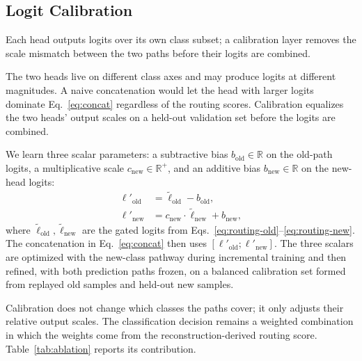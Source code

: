 \subsection{Logit Calibration}\label{sec:calib}

Each head outputs logits over its own class subset; a calibration layer removes the scale mismatch between the two paths before their logits are combined.

The two heads live on different class axes and may produce logits at different magnitudes. A naive concatenation would let the head with larger logits dominate Eq.~\eqref{eq:concat} regardless of the routing scores. Calibration equalizes the two heads' output scales on a held-out validation set before the logits are combined.

We learn three scalar parameters: a subtractive bias $b_{\mathrm{old}} \in \mathbb{R}$ on the old-path logits, a multiplicative scale $c_{\mathrm{new}} \in \mathbb{R}^+$, and an additive bias $b_{\mathrm{new}} \in \mathbb{R}$ on the new-head logits:
\begin{align}
\ell'_{\mathrm{old}} &= \tilde{\ell}_{\mathrm{old}} - b_{\mathrm{old}},\label{eq:calib-old}\\
\ell'_{\mathrm{new}} &= c_{\mathrm{new}} \cdot \tilde{\ell}_{\mathrm{new}} + b_{\mathrm{new}},\label{eq:calib-new}
\end{align}
where $\tilde{\ell}_{\mathrm{old}}, \tilde{\ell}_{\mathrm{new}}$ are the gated logits from Eqs.~\eqref{eq:routing-old}--\eqref{eq:routing-new}. The concatenation in Eq.~\eqref{eq:concat} then uses $[\ell'_{\mathrm{old}}; \ell'_{\mathrm{new}}]$. The three scalars are optimized with the new-class pathway during incremental training and then refined, with both prediction paths frozen, on a balanced calibration set formed from replayed old samples and held-out new samples.

Calibration does not change which classes the paths cover; it only adjusts their relative output scales. The classification decision remains a weighted combination in which the weights come from the reconstruction-derived routing score. Table~\ref{tab:ablation} reports its contribution.

